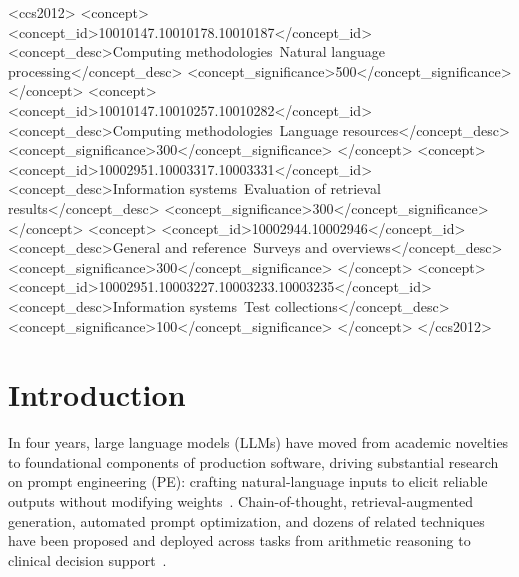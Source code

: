\documentclass[acmsmall, nonacm, screen]{acmart}
\begin{document}

\begin{CCSXML}
<ccs2012>
   <concept>
       <concept_id>10010147.10010178.10010187</concept_id>
       <concept_desc>Computing methodologies~Natural language processing</concept_desc>
       <concept_significance>500</concept_significance>
       </concept>
   <concept>
       <concept_id>10010147.10010257.10010282</concept_id>
       <concept_desc>Computing methodologies~Language resources</concept_desc>
       <concept_significance>300</concept_significance>
       </concept>
   <concept>
       <concept_id>10002951.10003317.10003331</concept_id>
       <concept_desc>Information systems~Evaluation of retrieval results</concept_desc>
       <concept_significance>300</concept_significance>
       </concept>
   <concept>
       <concept_id>10002944.10002946</concept_id>
       <concept_desc>General and reference~Surveys and overviews</concept_desc>
       <concept_significance>300</concept_significance>
       </concept>
   <concept>
       <concept_id>10002951.10003227.10003233.10003235</concept_id>
       <concept_desc>Information systems~Test collections</concept_desc>
       <concept_significance>100</concept_significance>
       </concept>
 </ccs2012>
\end{CCSXML}


\maketitle

\section{Introduction}
\label{sec:introduction}
In four years, large language models (LLMs) have moved from academic
novelties to foundational components of production software, driving
substantial research on prompt engineering (PE): crafting natural-language
inputs to elicit reliable outputs without modifying
weights~\cite{liu2021pretrain, schulhoff2024prompt}. Chain-of-thought,
retrieval-augmented generation, automated prompt optimization, and
dozens of related techniques have been proposed and deployed across
tasks from arithmetic reasoning to clinical decision
support~\cite{wei2022chain, lewis2020retrieval, sahoo2024systematic}.
\end{document}
